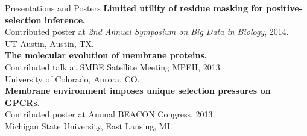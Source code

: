 \documentclass{resume} %
\begin{document}
\begin{rSection}{Presentations and Posters}
\textbf{Limited utility of residue masking for positive-selection inference.}
\\Contributed poster at \emph{2nd Annual Symposium on Big Data in Biology}, 2014.
\\ UT Austin, Austin, TX.\\

\textbf{The molecular evolution of membrane proteins.}
\\Contributed talk at SMBE Satellite Meeting MPEII, 2013.
\\ University of Colorado, Aurora, CO. \\

\textbf{Membrane environment imposes unique selection pressures on GPCRs.}
\\Contributed poster at Annual BEACON Congress, 2013.
\\ Michigan State University, East Lansing, MI.


\end{rSection}

\end{document}
